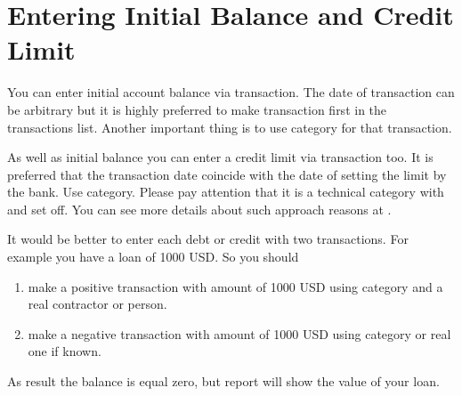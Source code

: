 \documentclass[a4paper,10pt,english]{sphinxmanual}
\begin{document}
\section{Entering Initial Balance and Credit Limit}
\label{\detokenize{getting-started:entering-initial-balance-and-credit-limit}}
You can enter initial account balance via transaction. The date of transaction can be arbitrary but it is
highly preferred to make transaction first in the transactions list.
Another important thing is to use category  for that transaction.

\noindent{}
\noindent{}

As well as initial balance you can enter a credit limit via transaction too. It is preferred that the transaction date coincide with the date of setting the limit by the bank.
Use  category. Please pay attention that it is a technical category with
 and  set off. You can see more details about such approach reasons
at .

\noindent{}
\noindent{}

It would be better to enter each debt or credit with two transactions. For example you have a loan of 1000 USD. So you should
\begin{enumerate}
\def\theenumi{\arabic{enumi}}
\def\labelenumi{\theenumi .}
\makeatletter\def\p@enumii{\p@enumi \theenumi .}\makeatother
\item {} 
make a positive transaction with amount of 1000 USD using category  and a real contractor or person.

\item {} 
make a negative transaction with amount of 1000 USD using category  or real one if known.

\end{enumerate}

As result the balance is equal zero, but  report will show the value of your loan.
\end{document}

